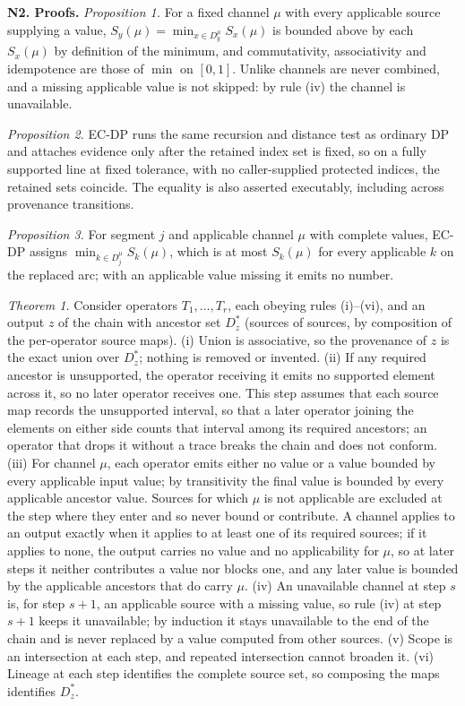 \documentclass[11pt]{article}
\begin{document}
\vspace{4mm}
\noindent\textbf{N2. Proofs.} \emph{Proposition 1.} For a fixed channel $\mu$ with every applicable source supplying a value, $S_y(\mu)=\min_{x\in D_y^{\mu}}S_x(\mu)$ is bounded above by each $S_x(\mu)$ by definition of the minimum, and commutativity, associativity and idempotence are those of $\min$ on $[0,1]$. Unlike channels are never combined, and a missing applicable value is not skipped: by rule (iv) the channel is unavailable.

\emph{Proposition 2.} EC-DP runs the same recursion and distance test as ordinary DP and attaches evidence only after the retained index set is fixed, so on a fully supported line at fixed tolerance, with no caller-supplied protected indices, the retained sets coincide. The equality is also asserted executably, including across provenance transitions.

\emph{Proposition 3.} For segment $j$ and applicable channel $\mu$ with complete values, EC-DP assigns $\min_{k\in D_j^{\mu}}S_k(\mu)$, which is at most $S_k(\mu)$ for every applicable $k$ on the replaced arc; with an applicable value missing it emits no number.

\emph{Theorem 1.} Consider operators $T_1,\ldots,T_r$, each obeying rules (i)--(vi), and an output $z$ of the chain with ancestor set $D_z^{*}$ (sources of sources, by composition of the per-operator source maps). (i) Union is associative, so the provenance of $z$ is the exact union over $D_z^{*}$; nothing is removed or invented. (ii) If any required ancestor is unsupported, the operator receiving it emits no supported element across it, so no later operator receives one. This step assumes that each source map records the unsupported interval, so that a later operator joining the elements on either side counts that interval among its required ancestors; an operator that drops it without a trace breaks the chain and does not conform. (iii) For channel $\mu$, each operator emits either no value or a value bounded by every applicable input value; by transitivity the final value is bounded by every applicable ancestor value. Sources for which $\mu$ is not applicable are excluded at the step where they enter and so never bound or contribute. A channel applies to an output exactly when it applies to at least one of its required sources; if it applies to none, the output carries no value and no applicability for $\mu$, so at later steps it neither contributes a value nor blocks one, and any later value is bounded by the applicable ancestors that do carry $\mu$. (iv) An unavailable channel at step $s$ is, for step $s+1$, an applicable source with a missing value, so rule (iv) at step $s+1$ keeps it unavailable; by induction it stays unavailable to the end of the chain and is never replaced by a value computed from other sources. (v) Scope is an intersection at each step, and repeated intersection cannot broaden it. (vi) Lineage at each step identifies the complete source set, so composing the maps identifies $D_z^{*}$.
\end{document}
